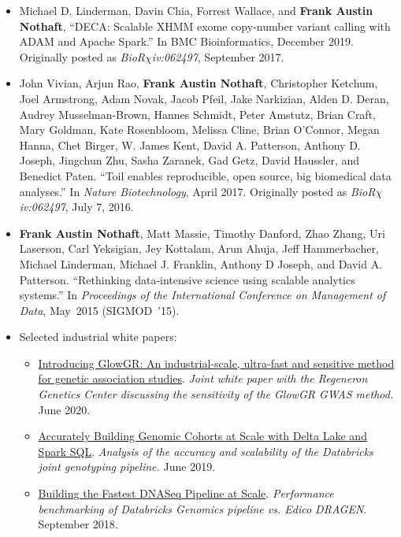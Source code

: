 \documentclass[10pt]{article} %
\begin{document}
\begin {minipage}[t]{0.2\linewidth}
\vspace{0pt}
\end {minipage}
\begin {minipage}[t]{0.8\linewidth}
\vspace{0pt}

\begin{itemize}
\item {Michael D. Linderman, Davin Chia, Forrest Wallace, and \textbf{Frank Austin Nothaft}, ``DECA:
Scalable XHMM exome copy-number variant calling with ADAM and Apache Spark.'' In BMC Bioinformatics, December 2019. Originally posted as
\emph{BioR$\chi$iv:062497}, September 2017.}
\item {John Vivian, Arjun Rao, \textbf{Frank Austin Nothaft}, Christopher Ketchum,
Joel Armstrong, Adam Novak, Jacob Pfeil, Jake Narkizian, Alden D. Deran,
Audrey Musselman-Brown, Hannes Schmidt, Peter Amstutz, Brian Craft, Mary Goldman,
Kate Rosenbloom, Melissa Cline, Brian O'Connor, Megan Hanna, Chet Birger,
W. James Kent, David A. Patterson, Anthony D. Joseph, Jingchun Zhu,
Sasha Zaranek, Gad Getz, David Haussler, and Benedict Paten. ``Toil enables reproducible,
open source, big biomedical data analyses.'' In \emph{Nature
Biotechnology}, April 2017. Originally posted as \emph{BioR$\chi$iv:062497}, July 7, 2016.}
\item {\textbf{Frank Austin Nothaft}, Matt Massie, Timothy Danford, Zhao Zhang,
Uri Laserson, Carl Yeksigian, Jey Kottalam, Arun Ahuja, Jeff Hammerbacher,
Michael Linderman, Michael J. Franklin, Anthony D Joseph, and David A. Patterson.
``Rethinking data-intensive science using scalable analytics systems.'' In
\emph{Proceedings of the International Conference on Management of Data},
May~2015 (SIGMOD~'15).}
\item {Selected industrial white papers:}
\begin{itemize}
\item {\href{https://www.databricks.com/blog/2020/06/25/introducing-glowgr-an-industrial-scale-ultra-fast-and-sensitive-method-for-genetic-association-studies.html}{Introducing GlowGR: An industrial-scale, ultra-fast and sensitive method for genetic association studies}. \emph{Joint white paper with the Regeneron Genetics Center discussing the sensitivity of the GlowGR GWAS method.} June 2020.}
\item {\href{https://www.databricks.com/blog/2019/06/19/accurately-building-genomic-cohorts-at-scale-with-delta-lake-and-spark-sql.html}{Accurately Building Genomic Cohorts at Scale with Delta Lake and Spark SQL}. \emph{Analysis of the accuracy and scalability of the Databricks joint genotyping pipeline.} June 2019.}
\item {\href{https://www.databricks.com/blog/2018/09/10/building-the-fastest-dnaseq-pipeline-at-scale.html}{Building the Fastest DNASeq Pipeline at Scale}. \emph{Performance benchmarking of Databricks Genomics pipeline vs. Edico DRAGEN}. September 2018.}
\end{itemize}
\end{itemize}
  
\noindent{}
\end {minipage}
\end{document}
